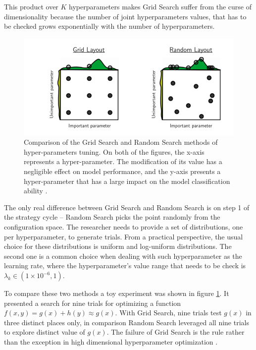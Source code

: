This product over $K$ hyperparameters makes Grid Search suffer from the curse of dimensionality because the number of joint hyperparameters values, that has to be checked grows exponentially with the number of hyperparameters. 

\begin{figure}
\centering
\includegraphics{figures/GridSearch.png}
\caption{Comparison of the Grid Search and Random Search methods of hyper-parameters tuning. 
On both of the figures, the x-axis represents a hyper-parameter. The modification of its value has a negligible effect on model performance, and the y-axis presents a hyper-parameter that has a large impact on the model classification ability \cite{RandomSearch}. 
\label{fig:GridSearch}}
\end{figure} 

The only real difference between Grid Search and Random Search is on step 1 of the strategy cycle – Random Search picks the point randomly from the configuration space. 
The researcher needs to provide a set of distributions, one per hyperparameter, to generate trials. From a practical perspective, the usual choice for these distributions is uniform and log-uniform distributions. The second one is a common choice when dealing with such hyperparameter as the learning rate, where the hyperparameter's value range that needs to be check is   $ \lambda_k \in (1\times 10^{-6},1)$. 


To compare these two methods a toy experiment was shown in figure \ref{fig:GridSearch}. It presented a search for nine trials for optimizing a function \\ $f(x,y) = g(x) + h(y) \approx g(x)$. With Grid Search, nine trials test $g(x)$ in three distinct places only, in comparison Random Search leveraged all nine trials to explore distinct value of $g(x)$. The failure of Grid Search is the rule rather than the exception in high dimensional hyperparameter optimization \cite{RandomSearch}. 
 


